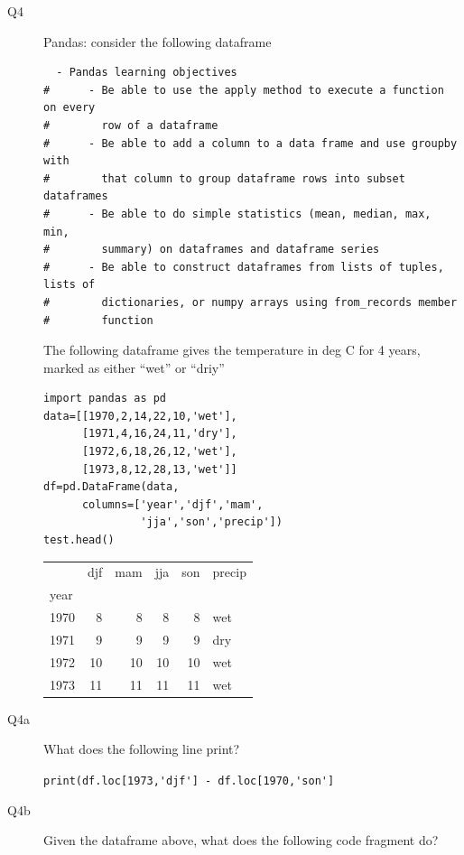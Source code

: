 \documentclass{article}
\begin{document}
\begin{description}

\item[Q4]  Pandas: consider the following dataframe  

\begin{verbatim}
  - Pandas learning objectives
#      - Be able to use the apply method to execute a function on every
#        row of a dataframe
#      - Be able to add a column to a data frame and use groupby with
#        that column to group dataframe rows into subset dataframes
#      - Be able to do simple statistics (mean, median, max, min,
#        summary) on dataframes and dataframe series
#      - Be able to construct dataframes from lists of tuples, lists of
#        dictionaries, or numpy arrays using from_records member
#        function
\end{verbatim}


  The following dataframe gives the temperature in deg C for 4 years, marked
  as either ``wet'' or ``driy''
  
\begin{lstlisting}[firstnumber=1]  
import pandas as pd
data=[[1970,2,14,22,10,'wet'],
      [1971,4,16,24,11,'dry'],
      [1972,6,18,26,12,'wet'],
      [1973,8,12,28,13,'wet']]
df=pd.DataFrame(data,
      columns=['year','djf','mam',
               'jja','son','precip'])
test.head()
\end{lstlisting}

\begin{tabular}{lrrrrl}
\toprule
{} &  djf &  mam &  jja &  son & precip \\
year &      &      &      &      &        \\
\midrule
1970 &    8 &    8 &    8 &    8 &      wet \\
1971 &    9 &    9 &    9 &    9 &      dry \\
1972 &   10 &   10 &   10 &   10 &      wet \\
1973 &   11 &   11 &   11 &   11 &      wet \\
\bottomrule
\end{tabular}

\item[Q4a] What does the following line print?

\verb+print(df.loc[1973,'djf'] - df.loc[1970,'son']+

\item[Q4b]

  Given the dataframe above, what does the following code fragment do?


\end{description}
\end{document}
